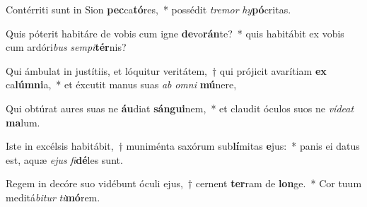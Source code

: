 \item Contérriti sunt in Sion \textbf{pec}ca\textbf{tó}res,~* possédit \textit{tre}\textit{mor} \textit{hy}\textbf{pó}critas.
\item Quis póterit habitáre de vobis cum igne \textbf{de}vo\textbf{rán}te?~* quis habitábit ex vobis cum ardóri\textit{bus} \textit{sem}\textit{pi}\textbf{tér}nis?
\item Qui ámbulat in justítiis, et lóquitur veritátem,~† qui prójicit avarítiam \textbf{ex} ca\textbf{lúm}\textbf{ni}a,~* et éxcutit manus suas \textit{ab} \textit{om}\textit{ni} \textbf{mú}nere,
\item Qui obtúrat aures suas ne \textbf{áu}diat \textbf{sán}\textbf{gui}nem,~* et claudit óculos suos ne \textit{ví}\textit{de}\textit{at} \textbf{ma}lum.
\item Iste in excélsis habitábit,~† muniménta saxórum sub\textbf{lí}mitas \textbf{e}jus:~* panis ei datus est, aquæ \textit{e}\textit{jus} \textit{fi}\textbf{dé}les sunt.
\item Regem in decóre suo vidébunt óculi ejus,~† cernent \textbf{ter}ram de \textbf{lon}ge.~* Cor tuum meditá\textit{bi}\textit{tur} \textit{ti}\textbf{mó}rem.
